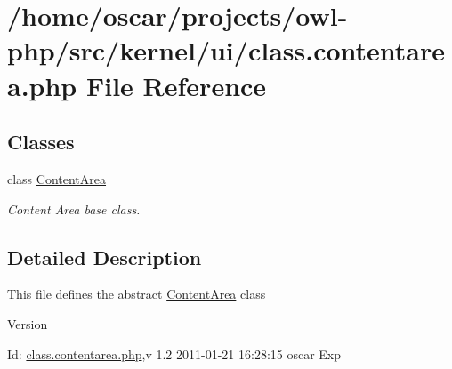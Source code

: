 \section{/home/oscar/projects/owl-\/php/src/kernel/ui/class.contentarea.php File Reference}
\label{class_8contentarea_8php}
\subsection*{Classes}
\begin{DoxyCompactItemize}
\item 
class \hyperlink{classContentArea}{ContentArea}
\begin{DoxyCompactList}\small\item\em Content Area base class. \item\end{DoxyCompactList}\end{DoxyCompactItemize}


\subsection{Detailed Description}
This file defines the abstract \hyperlink{classContentArea}{ContentArea} class \begin{DoxyVersion}{Version}

\end{DoxyVersion}
\begin{DoxyParagraph}{Id:}
\hyperlink{class_8contentarea_8php}{class.contentarea.php},v 1.2 2011-\/01-\/21 16:28:15 oscar Exp 
\end{DoxyParagraph}
